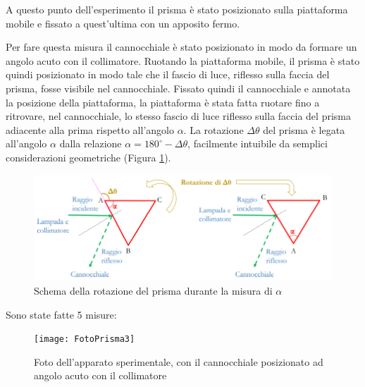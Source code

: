 \documentclass{article}
\begin{document}
A questo punto dell'esperimento il prisma è stato posizionato sulla piattaforma mobile e fissato a quest'ultima con un apposito fermo.

\vspace{5mm}

Per fare questa misura il cannocchiale è stato posizionato in modo da formare un angolo acuto con il collimatore. Ruotando la piattaforma mobile, il prisma è stato quindi posizionato in modo tale che il fascio di luce, riflesso sulla faccia del prisma, fosse visibile nel cannocchiale. Fissato quindi il cannocchiale e annotata la posizione della piattaforma, la piattaforma è stata fatta ruotare fino a ritrovare, nel cannocchiale, lo stesso fascio di luce riflesso sulla faccia del prisma adiacente alla prima rispetto all'angolo $\alpha$. La rotazione $\Delta \theta$ del prisma è legata all'angolo $\alpha$ dalla relazione $\alpha=180^{\circ}-\Delta \theta$, facilmente intuibile da semplici considerazioni geometriche (Figura \ref{SchemaRiflessione}).

\begin{figure}[h]
  \centering
  \includegraphics[width=0.7\linewidth]{Schema_Prisma_2}
  \caption{Schema della rotazione del prisma durante la misura di $\alpha$}
  \label{SchemaRiflessione}
\end{figure}

Sono state fatte 5 misure:

\vspace{5mm}

\begin{figure}[h]
  \centering
  \texttt{[image: FotoPrisma3]}
  \caption{Foto dell'apparato sperimentale, con il cannocchiale posizionato ad angolo acuto con il collimatore}
\end{figure}
\end{document}
